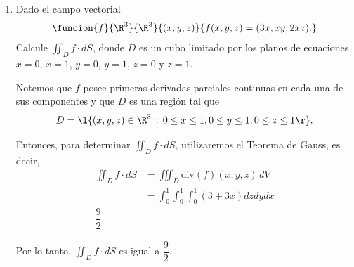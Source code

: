 \documentclass[a4,11pt]{aleph-examen}
\begin{document}
\begin{preguntas}
\begin{respuesta}
\begin{respuesta}
\begin{respuesta}
\begin{enumerate}
\begin{respuesta}
    Notemos que $f$ posee primeras derivadas parciales continuas en cada una de sus componentes y que $D$ es una región tal que  
\[
D = \l\{(x,y,z)\in\R^3\,:\,-1\leq x \leq 2, -1 \leq y \leq 1, -\sqrt{1-y^2}\leq z \leq \sqrt{1-y^2}\r\}.
\]

\noindent Entonces, para determinar el flujo, $\iint_{D}{f\cdot dS}$, utilizaremos el Teorema de Gauss, es decir, 
    \begin{align*}
    \iint_{D}{f\cdot dS} &= \iiint_{D}{\mbox{div}(f)(x,y,z)\,dV}\\
    &= \int_{-1}^{2}{\int_{-1}^{1}{\int_{-\sqrt{1-y^2}}^{\sqrt{1-y^2}}{3(y^2 + z^2)\,dz}dy}dx}.
    \end{align*}
    Con el cambio de variables $x=t$, $y=r\cos\theta$ y $z=r\sen\theta$, se obtiene que 
    \[
    \iint_{D}{f\cdot dS} = 3\int_{-1}^{2}{\int_{0}^{2\pi}{\int_{0}^{1}{(r^2)rdr}d\theta}dt} = \dfrac{9}{2}\pi.
    \]
    
    \noindent Por lo tanto, el flujo de $f$ a través de $D$ es igual a $\dfrac{9}{2}\pi$.
\end{respuesta}

\item
    Dado el campo vectorial
    \[
    \funcion{f}{\R^3}{\R^3}
    {(x,y,z)}{f(x,y,z)=(3x,xy,2xz).}
	\]
    Calcule $\iint_{D}{f\cdot dS}$, donde $D$ es un cubo limitado por los planos de ecuaciones $x=0$, $x=1$, $y=0$, $y=1$, $z=0$ y $z=1$.

\begin{respuesta}
Notemos que $f$ posee primeras derivadas parciales continuas en cada una de sus componentes y que $D$ es una región tal que  
\[
D = \l\{(x,y,z)\in\R^3\,:\,0\leq x \leq 1, 0 \leq y \leq 1, 0 \leq z \leq 1\r\}.
\]

\noindent Entonces, para determinar $\iint_{D}{f\cdot dS}$, utilizaremos el Teorema de Gauss, es decir, 
    \begin{align*}
    \iint_{D}{f\cdot dS} &= \iiint_{D}{\mbox{div}(f)(x,y,z)\,dV}\\
    &= \int_{0}^{1}{\int_{0}^{1}{\int_{0}^{1}{(3+3x)dz}dy}dx}\\
    \dfrac{9}{2}.
    \end{align*}
    
    \noindent Por lo tanto, $\iint_{D}{f\cdot dS}$ es igual a  $\dfrac{9}{2}$.
\end{respuesta}


\end{enumerate}
\end{respuesta}
\end{respuesta}
\end{respuesta}
\end{preguntas}
\end{document}
